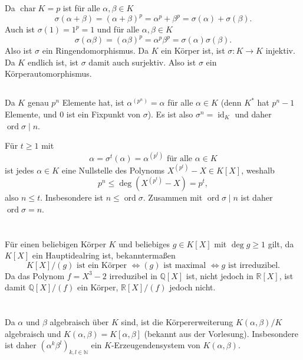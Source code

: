 \documentclass[a4paper,10pt]{article}
\theoremstyle{definition}
\newcommand{\N}{\mathbb{N}}
\newcommand{\Q}{\mathbb{Q}}
\newcommand{\R}{\mathbb{R}}
\newcommand{\id}{\operatorname{id}}
\newcommand{\ord}{\operatorname{ord}}
\newcommand{\kchar}{\operatorname{char}}
\begin{document}
Da $\kchar K = p$ ist für alle $\alpha, \beta \in K$
\[
 \sigma(\alpha + \beta) = (\alpha + \beta)^p = \alpha^p + \beta^p = \sigma(\alpha) + \sigma(\beta).
\]
Auch ist $\sigma(1) = 1^p = 1$ und für alle $\alpha, \beta \in K$
\[
 \sigma(\alpha\beta) = (\alpha\beta)^p = \alpha^p \beta^p = \sigma(\alpha) \sigma(\beta).
\]
Also ist $\sigma$ ein Ringendomorphismus. Da $K$ ein Körper ist, ist $\sigma : K \rightarrow K$ injektiv. Da $K$ endlich ist, ist $\sigma$ damit auch surjektiv. Also ist $\sigma$ ein Körperautomorphismus.


\subsection{}
Da $K$ genau $p^n$ Elemente hat, ist $\alpha^{(p^n)} = \alpha$ für alle $\alpha \in K$ (denn $K^*$ hat $p^n-1$ Elemente, und $0$ ist ein Fixpunkt von $\sigma$). Es ist also $\sigma^n = \id_K$ und daher $\ord \sigma \mid n$.

Für $t \geq 1$ mit
\[
 \alpha = \sigma^t(\alpha) = \alpha^{(p^t)} \text{ für alle } \alpha \in K
\]
ist jedes $\alpha \in K$ eine Nullstelle des Polynoms $X^{(p^t)} -X \in K[X]$, weshalb
\[
 p^n \leq \deg \left( X^{(p^t)}-X \right) = p^t,
\]
also $n \leq t$. Insbesondere ist $n \leq \ord \sigma$. Zusammen mit $\ord \sigma \mid n$ ist daher $\ord \sigma = n$.





\section{}
Für einen beliebigen Körper $K$ und beliebiges $g \in K[X]$ mit $\deg g \geq 1$ gilt, da $K[X]$ ein Hauptidealring ist, bekanntermaßen
\[
 K[X]/(g) \text{ ist ein Körper }
 \Leftrightarrow (g) \text{ ist maximal }
 \Leftrightarrow g \text{ ist irreduzibel}.
\]
Da das Polynom $f = X^3 - 2$ irreduzibel in $\Q[X]$ ist, nicht jedoch in $\R[X]$, ist damit $\Q[X]/(f)$ ein Körper, $\R[X]/(f)$ jedoch nicht.





\section{}


\subsection{}
Da $\alpha$ und $\beta$ algebraisch über $K$ sind, ist die Körpererweiterung $K(\alpha,\beta)/K$ algebraisch und $K(\alpha, \beta) = K[\alpha, \beta]$ (bekannt aus der Vorlesung). Insbesondere ist daher $(\alpha^k \beta^l)_{k,l \in \N}$ ein $K$-Erzeugenden\-system von $K(\alpha,\beta)$.
\end{document}
